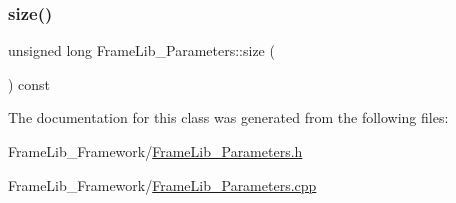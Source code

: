 \mbox{\label{class_frame_lib___parameters_a391d0cb37c904981f7ad52bc0ba1b111}} 
\subsubsection{\texorpdfstring{size()}{size()}}
{\footnotesize\ttfamily unsigned long Frame\+Lib\+\_\+\+Parameters\+::size (\begin{DoxyParamCaption}{ }\end{DoxyParamCaption}) const\hspace{0.3cm}{\ttfamily [inline]}}



The documentation for this class was generated from the following files\+:\begin{DoxyCompactItemize}
\item 
Frame\+Lib\+\_\+\+Framework/\hyperlink{_frame_lib___parameters_8h}{Frame\+Lib\+\_\+\+Parameters.\+h}\item 
Frame\+Lib\+\_\+\+Framework/\hyperlink{_frame_lib___parameters_8cpp}{Frame\+Lib\+\_\+\+Parameters.\+cpp}\end{DoxyCompactItemize}
